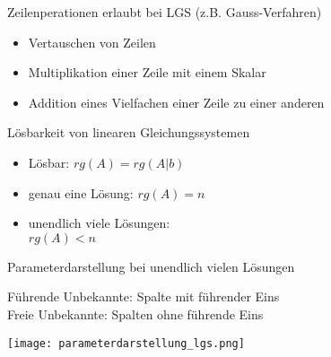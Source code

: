 \begin{KR}{Zeilenperationen} erlaubt bei LGS (z.B. Gauss-Verfahren)
        \begin{itemize}
            \item Vertauschen von Zeilen
            \item Multiplikation einer Zeile mit einem Skalar
            \item Addition eines Vielfachen einer Zeile zu einer anderen
        \end{itemize}
    \end{KR}
    
    

    

    \begin{theorem}{Lösbarkeit von linearen Gleichungssystemen}

        \begin{minipage}{0.5\linewidth}
            \begin{itemize}
                \item Lösbar: $rg(A) = rg(A|b)$
                \item genau eine Lösung: $rg(A) = n$
            \end{itemize}
        \end{minipage}
        \begin{minipage}{0.5\linewidth}
            \begin{itemize}
                \item unendlich viele Lösungen:\\ $rg(A) < n$
            \end{itemize}
        \end{minipage}
    \end{theorem}

    \begin{KR}{Parameterdarstellung} bei unendlich vielen Lösungen

        \begin{minipage}{0.74\linewidth}
            Führende Unbekannte: Spalte mit führender Eins\\
            Freie Unbekannte: Spalten ohne führende Eins
        \end{minipage}
        \begin{minipage}{0.25\linewidth}
            \texttt{[image: parameterdarstellung\_lgs.png]}
        \end{minipage}
    \end{KR}

